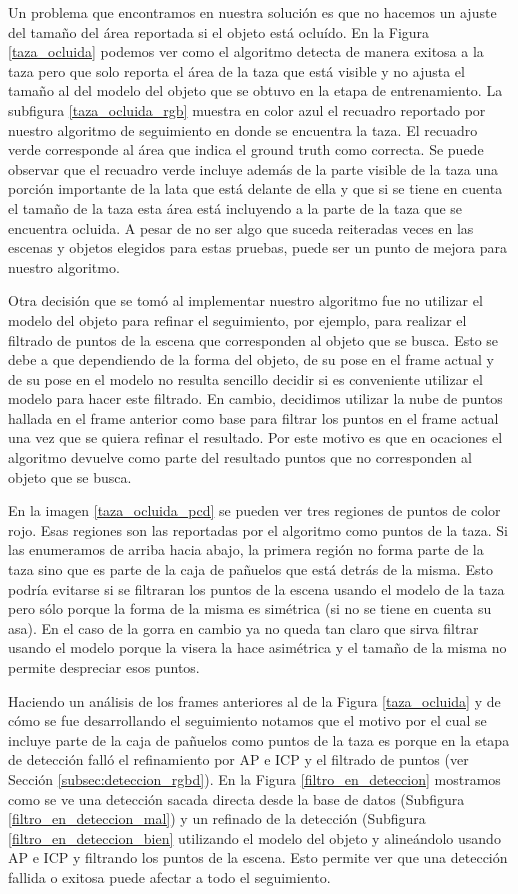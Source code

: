 Un problema que encontramos en nuestra solución es que no hacemos un ajuste del tamaño del área reportada si el objeto está ocluído. En la Figura \ref{taza_ocluida} podemos ver como el algoritmo detecta de manera exitosa a la taza pero que solo reporta el área de la taza que está visible y no ajusta el tamaño al del modelo del objeto que se obtuvo en la etapa de entrenamiento. La subfigura \ref{taza_ocluida_rgb} muestra en color azul el recuadro reportado por nuestro algoritmo de seguimiento en donde se encuentra la taza. El recuadro verde corresponde al área que indica el ground truth como correcta. Se puede observar que el recuadro verde incluye además de la parte visible de la taza una porción importante de la lata que está delante de ella y que si se tiene en cuenta el tamaño de la taza esta área está incluyendo a la parte de la taza que se encuentra ocluida. A pesar de no ser algo que suceda reiteradas veces en las escenas y objetos elegidos para estas pruebas, puede ser un punto de mejora para nuestro algoritmo.

Otra decisión que se tomó al implementar nuestro algoritmo fue no utilizar el modelo del objeto para refinar el seguimiento, por ejemplo, para realizar el filtrado de puntos de la escena que corresponden al objeto que se busca. Esto se debe a que dependiendo de la forma del objeto, de su pose en el frame actual y de su pose en el modelo no resulta sencillo decidir si es conveniente utilizar el modelo para hacer este filtrado. En cambio, decidimos utilizar la nube de puntos hallada en el frame anterior como base para filtrar los puntos en el frame actual una vez que se quiera refinar el resultado. Por este motivo es que en ocaciones el algoritmo devuelve como parte del resultado puntos que no corresponden al objeto que se busca.

En la imagen \ref{taza_ocluida_pcd} se pueden ver tres regiones de puntos de color rojo. Esas regiones son las reportadas por el algoritmo como puntos de la taza. Si las enumeramos de arriba hacia abajo, la primera región no forma parte de la taza sino que es parte de la caja de pañuelos que está detrás de la misma. Esto podría evitarse si se filtraran los puntos de la escena usando el modelo de la taza pero sólo porque la forma de la misma es simétrica (si no se tiene en cuenta su asa). En el caso de la gorra en cambio ya no queda tan claro que sirva filtrar usando el modelo porque la visera la hace asimétrica y el tamaño de la misma no permite despreciar esos puntos.

Haciendo un análisis de los frames anteriores al de la Figura \ref{taza_ocluida} y de cómo se fue desarrollando el seguimiento notamos que el motivo por el cual se incluye parte de la caja de pañuelos como puntos de la taza es porque en la etapa de detección falló el refinamiento por AP e ICP y el filtrado de puntos (ver Sección \ref{subsec:deteccion_rgbd}). En la Figura \ref{filtro_en_deteccion} mostramos como se ve una detección sacada directa desde la base de datos (Subfigura \ref{filtro_en_deteccion_mal}) y un refinado de la detección (Subfigura \ref{filtro_en_deteccion_bien} utilizando el modelo del objeto y alineándolo usando AP e ICP y filtrando los puntos de la escena. Esto permite ver que una detección fallida o exitosa puede afectar a todo el seguimiento.

